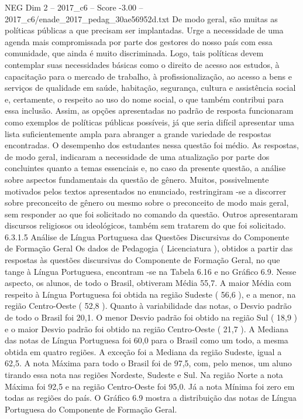 \begin{textsample}{NEG Dim 2 – 2017\_c6 – Score -3.00 – 2017\_c6/enade\_2017\_pedag\_30ae56952d.txt}
De modo geral, são muitas as políticas públicas a que precisam ser implantadas.
Urge a necessidade de uma agenda mais compromissada por parte dos gestores do nosso país com essa comunidade, que ainda é muito discriminada.
Logo, tais políticas devem contemplar suas necessidades básicas como o direito de acesso aos estudos, à capacitação para o mercado de trabalho, à profissionalização, ao acesso a bens e serviços de qualidade em saúde, habitação, segurança, cultura e assistência social e, certamente, o respeito ao uso do nome social, o que também contribui para essa inclusão.
Assim, as opções apresentadas no padrão de resposta funcionaram como exemplos de políticas públicas possíveis, já que seria difícil apresentar uma lista suficientemente ampla para abranger a grande variedade de respostas encontradas.
O desempenho dos estudantes nessa questão foi médio.
As respostas, de modo geral, indicaram a necessidade de uma atualização por parte dos concluintes quanto a temas essenciais e, no caso da presente questão, a análise sobre aspectos fundamentais da questão de gênero.
Muitos, possivelmente motivados pelos textos apresentados no enunciado, restringiram -se a discorrer sobre preconceito de gênero ou mesmo sobre o preconceito de modo mais geral, sem responder ao que foi solicitado no comando da questão.
Outros apresentaram discursos religiosos ou ideológicos, também sem tratarem do que foi solicitado. 6.3.1.5 Análise de Língua Portuguesa das Questões Discursivas do Componente de Formação Geral Os dados de Pedagogia ( Licenciatura ), obtidos a partir das respostas às questões discursivas do Componente de Formação Geral, no que tange à Língua Portuguesa, encontram -se na Tabela 6.16 e no Gráfico 6.9.
Nesse aspecto, os alunos, de todo o Brasil, obtiveram Média 55,7.
A maior Média com respeito à Língua Portuguesa foi obtida na região Sudeste ( 56,6 ), e a menor, na região Centro-Oeste ( 52,8 ).
Quanto à variabilidade das notas, o Desvio padrão de todo o Brasil foi 20,1.
O menor Desvio padrão foi obtido na região Sul ( 18,9 ) e o maior Desvio padrão foi obtido na região Centro-Oeste ( 21,7 ).
A Mediana das notas de Língua Portuguesa foi 60,0 para o Brasil como um todo, a mesma obtida em quatro regiões.
A exceção foi a Mediana da região Sudeste, igual a 62,5.
A nota Máxima para todo o Brasil foi de 97,5, com, pelo menos, um aluno tirando essa nota nas regiões Nordeste, Sudeste e Sul.
Na região Norte a nota Máxima foi 92,5 e na região Centro-Oeste foi 95,0.
Já a nota Mínima foi zero em todas as regiões do país.
O Gráfico 6.9 mostra a distribuição das notas de Língua Portuguesa do Componente de Formação Geral.

\end{textsample}
